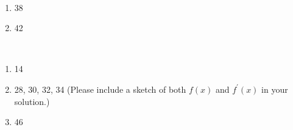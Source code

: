 \documentclass[12pt]{article}
\begin{document}
\\
\begin{enumerate}
\setlength{\itemsep}{-1mm}
\item 38
\item 42
\end{enumerate}


\\
\begin{enumerate}
\setlength{\itemsep}{-1mm}
\item 14
\item 28, 30, 32, 34 (Please include a sketch of both $f(x)$ and
  $f^\prime(x)$ in your solution.)
\item 46
\end{enumerate}
\end{document}
